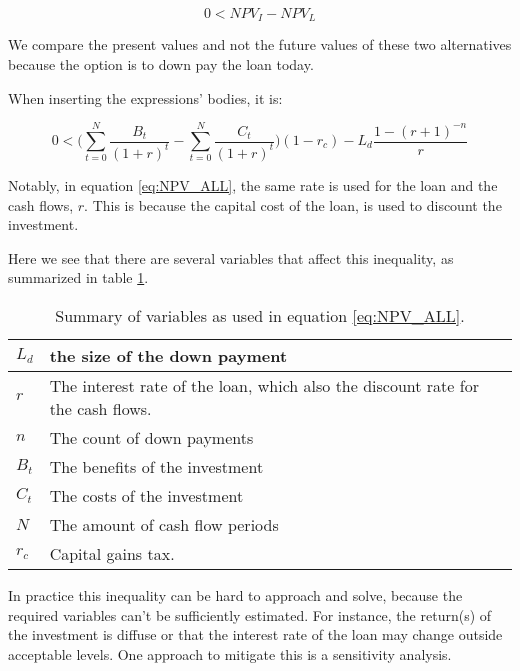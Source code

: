 \documentclass[a4paper]{article}
\begin{document}
\begin{equation}
0 < NPV_I - NPV_L
\end{equation}

We compare the present values and not the future values of these two
alternatives because the option is to down pay the loan today.

When inserting the expressions' bodies, it is:

\begin{equation}
\label{eq:NPV_ALL}
0 < {(\sum_{t=0}^{N} \frac{B_t}{(1 + r)^t} -
     \sum_{t=0}^{N} \frac{C_t}{(1 + r)^t}})(1 - r_c)
     - L_d \frac{1 - (r + 1)^{-n}}{r}
\end{equation}

Notably, in equation \ref{eq:NPV_ALL}, the same rate is used for the loan and
the cash flows, $r$. This is because the capital cost of the loan, is used to
discount the investment.

Here we see that there are several variables that affect this inequality, as
summarized in table \ref {Table:variables}.

\begin{table}
\begin{center}
\caption{Summary of variables as used in equation \ref{eq:NPV_ALL}.}
\label{Table:variables}
\begin{tabular}{ |l|p{4in}| }
 \hline
$L_d$  & the size of the down payment                                      \\
\hline
$r$    & The interest rate of the loan, which also the discount rate for the
         cash flows.                                                       \\
\hline
$n$    & The count of down payments                                        \\
\hline
$B_t$  & The benefits of the investment                                    \\
\hline
$C_t$  & The costs of the investment                                       \\
\hline
$N$    & The amount of cash flow periods                                   \\
\hline
$r_c$  & Capital gains tax.                                                \\
 \hline
\end{tabular}
\end{center}
\end{table}

In practice this inequality can be hard to approach and solve, because the
required variables can't be sufficiently estimated. For instance, the return(s)
of the investment is diffuse or that the interest rate of the loan may change
outside acceptable levels. One approach to mitigate this is a sensitivity
analysis.
\end{document}
